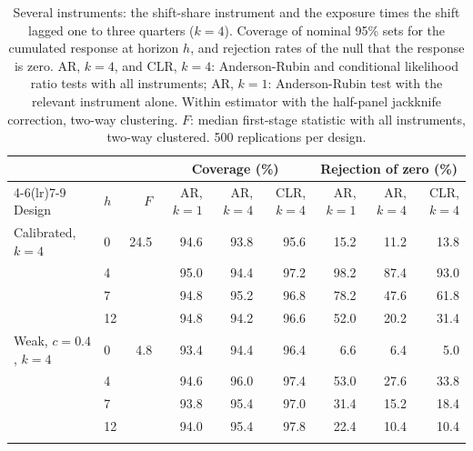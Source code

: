 \begin{table}[ht]\centering\footnotesize\setlength{\tabcolsep}{4pt}
\begin{tabular}{llr rrr rrr}\toprule
 & & & \multicolumn{3}{c}{Coverage (\%)} & \multicolumn{3}{c}{Rejection of zero (\%)}\\
\cmidrule(lr){4-6}\cmidrule(lr){7-9}
Design & $h$ & $F$ & AR, $k=1$ & AR, $k=4$ & CLR, $k=4$ & AR, $k=1$ & AR, $k=4$ & CLR, $k=4$\\\midrule
Calibrated, $k=4$ & 0 & 24.5 & 94.6 & 93.8 & 95.6 & 15.2 & 11.2 & 13.8\\
 & 4 &  & 95.0 & 94.4 & 97.2 & 98.2 & 87.4 & 93.0\\
 & 7 &  & 94.8 & 95.2 & 96.8 & 78.2 & 47.6 & 61.8\\
 & 12 &  & 94.8 & 94.2 & 96.6 & 52.0 & 20.2 & 31.4\\
\addlinespace
Weak, $c=0.4$, $k=4$ & 0 & 4.8 & 93.4 & 94.4 & 96.4 & 6.6 & 6.4 & 5.0\\
 & 4 &  & 94.6 & 96.0 & 97.4 & 53.0 & 27.6 & 33.8\\
 & 7 &  & 93.8 & 95.4 & 97.0 & 31.4 & 15.2 & 18.4\\
 & 12 &  & 94.0 & 95.4 & 97.8 & 22.4 & 10.4 & 10.4\\
\addlinespace
\bottomrule\end{tabular}
\caption{Several instruments: the shift-share instrument and the exposure times the shift lagged one to three quarters ($k=4$). Coverage of nominal 95\% sets for the cumulated response at horizon $h$, and rejection rates of the null that the response is zero. AR, $k=4$, and CLR, $k=4$: Anderson-Rubin and conditional likelihood ratio tests with all instruments; AR, $k=1$: Anderson-Rubin test with the relevant instrument alone. Within estimator with the half-panel jackknife correction, two-way clustering. $F$: median first-stage statistic with all instruments, two-way clustered. 500 replications per design.\label{tab:mc_clr}}
\end{table}